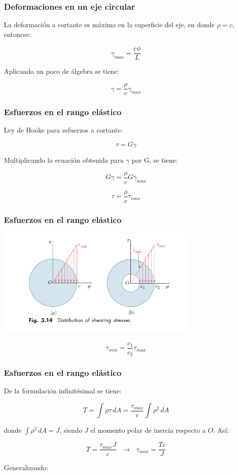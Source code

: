 \documentclass{beamer}
\begin{document}
\begin{frame}
\justifying
\frametitle{Deformaciones en un eje circular}

La deformación a cortante es máxima en la superficie del eje, en donde $\rho = c$, entonces:

$$ \gamma_{max} = \frac{c\phi}{L} $$

Aplicando un poco de álgebra se tiene:

$$ \gamma = \frac{\rho}{c} \gamma_{max} $$

\end{frame}


\begin{frame}
\justifying
\frametitle{Esfuerzos en el rango elástico}

Ley de Hooke para esfuerzos a cortante:

$$\tau = G \gamma $$

Multiplicando la ecuación obtenida para $\gamma$ por G, se tiene:

$$ G\gamma = \frac{\rho}{c} G \gamma_{max} $$

$$ \tau = \frac{\rho}{c} \tau_{max} $$

\end{frame}


\begin{frame}
\justifying
\frametitle{Esfuerzos en el rango elástico}

\begin{center}
\includegraphics[width=0.75\textwidth]{img/stress_distribution.PNG}
\end{center}

$$ \tau_{min} = \frac{c_1}{c_2} \tau_{max} $$

\end{frame}


\begin{frame}
\justifying
\frametitle{Esfuerzos en el rango elástico}

De la formulación infinitésimal se tiene:

$$ T = \int \rho \tau \, dA = \frac{\tau_{max}}{c} \int \rho^2 \, dA $$

donde $\int \rho^2 \, dA = J$, siendo $J$ el momento polar de inercia respecto a $O$. Así:

$$ T = \frac{\tau_{max} J}{c}  \,\,\,\, \rightarrow \,\,\,\, \tau_{max} = \frac{Tc}{J} $$

Generalizando:

\begin{center}
\end{center}

\end{frame}
\end{document}
